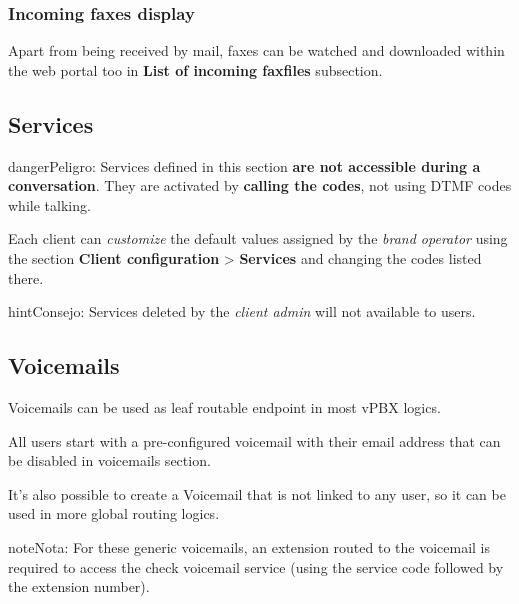 \documentclass[letterpaper,10pt,spanish]{sphinxmanual}
\begin{document}
\subsubsection{Incoming faxes display}
\label{administration_portal/client/vpbx/faxes:incoming-faxes-display}
Apart from being received by mail, faxes can be watched and downloaded within
the web portal too in \textbf{List of incoming faxfiles} subsection.
\label{administration_portal/client/vpbx/services:client-services}

\subsection{Services}
\label{administration_portal/client/vpbx/services:services}\label{administration_portal/client/vpbx/services:client-services}\label{administration_portal/client/vpbx/services::doc}\label{administration_portal/client/vpbx/services:id1}
\begin{notice}{danger}{Peligro:}
Services defined in this section \textbf{are not accessible during a
conversation}. They are activated by \textbf{calling the codes}, not using
DTMF codes while talking.
\end{notice}

Each client can \emph{customize} the default values assigned by the \emph{brand operator}
using the section \textbf{Client configuration} \textgreater{} \textbf{Services} and changing the codes
listed there.

\begin{notice}{hint}{Consejo:}
Services deleted by the \emph{client admin} will not available to users.
\end{notice}


\subsection{Voicemails}
\label{administration_portal/client/vpbx/voicemails:voicemails}\label{administration_portal/client/vpbx/voicemails::doc}\label{administration_portal/client/vpbx/voicemails:id1}
Voicemails can be used as leaf routable endpoint in most vPBX logics.

All users start with a pre-configured voicemail with their email address that can be disabled in voicemails section.

It's also possible to create a Voicemail that is not linked to any user, so it can be used in more global routing
logics.

\begin{notice}{note}{Nota:}
For these generic voicemails, an extension routed to the voicemail is required to access the check voicemail
service (using the service code followed by the extension number).
\end{notice}
\end{document}
